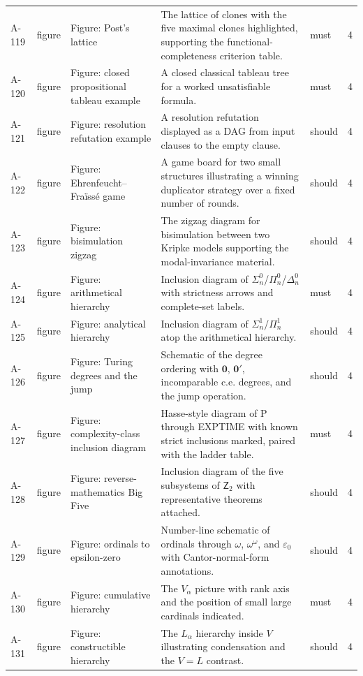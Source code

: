 \begin{longtable}{@{}p{0.45in}p{0.78in}p{2.02in}p{2.6in}p{0.42in}p{0.16in}@{}}
A-119 & figure & Figure: Post's lattice & The lattice of clones with the five maximal clones highlighted, supporting the functional-completeness criterion table. & must & 4 \\
A-120 & figure & Figure: closed propositional tableau example & A closed classical tableau tree for a worked unsatisfiable formula. & must & 4 \\
A-121 & figure & Figure: resolution refutation example & A resolution refutation displayed as a DAG from input clauses to the empty clause. & should & 4 \\
A-122 & figure & Figure: Ehrenfeucht--Fra\"iss\'e game & A game board for two small structures illustrating a winning duplicator strategy over a fixed number of rounds. & should & 4 \\
A-123 & figure & Figure: bisimulation zigzag & The zigzag diagram for bisimulation between two Kripke models supporting the modal-invariance material. & should & 4 \\
A-124 & figure & Figure: arithmetical hierarchy & Inclusion diagram of \(\Sigma^0_n\)/\(\Pi^0_n\)/\(\Delta^0_n\) with strictness arrows and complete-set labels. & must & 4 \\
A-125 & figure & Figure: analytical hierarchy & Inclusion diagram of \(\Sigma^1_n\)/\(\Pi^1_n\) atop the arithmetical hierarchy. & should & 4 \\
A-126 & figure & Figure: Turing degrees and the jump & Schematic of the degree ordering with \(\mathbf 0\), \(\mathbf 0'\), incomparable c.e. degrees, and the jump operation. & should & 4 \\
A-127 & figure & Figure: complexity-class inclusion diagram & Hasse-style diagram of P through EXPTIME with known strict inclusions marked, paired with the ladder table. & must & 4 \\
A-128 & figure & Figure: reverse-mathematics Big Five & Inclusion diagram of the five subsystems of \(\mathsf Z_2\) with representative theorems attached. & should & 4 \\
A-129 & figure & Figure: ordinals to epsilon-zero & Number-line schematic of ordinals through \(\omega\), \(\omega^\omega\), and \(\varepsilon_0\) with Cantor-normal-form annotations. & should & 4 \\
A-130 & figure & Figure: cumulative hierarchy & The \(V_\alpha\) picture with rank axis and the position of small large cardinals indicated. & must & 4 \\
A-131 & figure & Figure: constructible hierarchy & The \(L_\alpha\) hierarchy inside \(V\) illustrating condensation and the \(V=L\) contrast. & should & 4 \\

\end{longtable}
